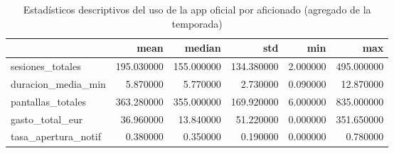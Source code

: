 \begin{table}
\caption{Estadísticos descriptivos del uso de la app oficial por aficionado (agregado de la temporada)}
\label{tab:descriptivos_app}
\begin{tabular}{lrrrrr}
\toprule
 & mean & median & std & min & max \\
\midrule
sesiones\_totales & 195.030000 & 155.000000 & 134.380000 & 2.000000 & 495.000000 \\
duracion\_media\_min & 5.870000 & 5.770000 & 2.730000 & 0.090000 & 12.870000 \\
pantallas\_totales & 363.280000 & 355.000000 & 169.920000 & 6.000000 & 835.000000 \\
gasto\_total\_eur & 36.960000 & 13.840000 & 51.220000 & 0.000000 & 351.650000 \\
tasa\_apertura\_notif & 0.380000 & 0.350000 & 0.190000 & 0.000000 & 0.780000 \\
\bottomrule
\end{tabular}
\end{table}
